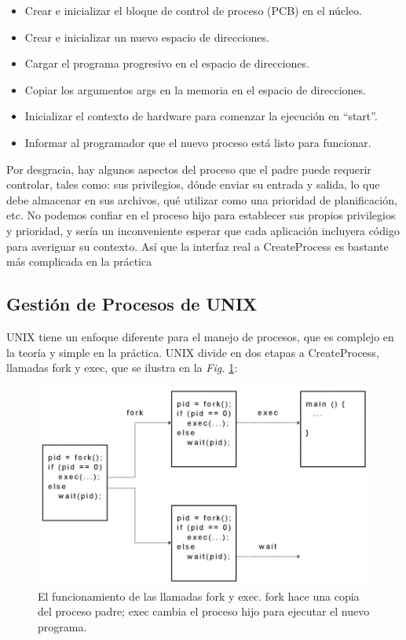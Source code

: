 \documentclass[10pt]{book}
\begin{document}
\begin{itemize}
\item Crear e inicializar el bloque de control de proceso (PCB) en el núcleo.
\item Crear e inicializar un nuevo espacio de direcciones.
\item Cargar el programa progresivo en el espacio de direcciones.
\item Copiar los argumentos {\mf args} en la memoria en el espacio de direcciones.
\item Inicializar el contexto de hardware para comenzar la ejecución en ``{\mf start}''.
\item Informar al programador que el nuevo proceso está listo para funcionar.
\end{itemize}

Por desgracia, hay algunos aspectos del proceso que el padre puede requerir controlar, tales como: sus privilegios, dónde enviar su entrada y salida, lo que debe almacenar en sus archivos, qué utilizar como una prioridad de planificación, etc. No podemos confiar en el proceso hijo para establecer sus propios privilegios y prioridad, y sería un inconveniente esperar que cada aplicación incluyera código para averiguar su contexto. Así que la interfaz real a {\mf CreateProcess} es bastante más complicada en la práctica

\subsection{Gestión de Procesos de UNIX}
UNIX tiene un enfoque diferente para el manejo de procesos, que es complejo en la teoría y simple en la práctica. UNIX divide en dos etapas a {\mf CreateProcess}, llamadas {\mf fork} y {\mf exec}, que se ilustra en la \textit{Fig.} \ref{fig0302}:
\begin{figure}[tbhp]
\centerline{\includegraphics[scale=0.50]{img/fig0302}}
\caption{El funcionamiento de las llamadas {\mf fork} y {\mf exec}. {\mf fork} hace una copia del proceso padre; {\mf exec} cambia el proceso hijo para ejecutar el nuevo programa.}
\label{fig0302}
\end{figure}
\end{document}
